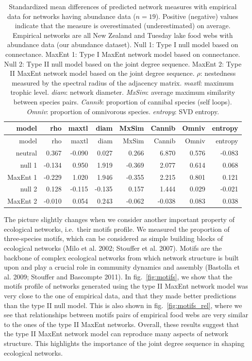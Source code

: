 \documentclass[10pt,oneside]{article}
\begin{document}
\hypertarget{tbl:measures_abund}{}
\begin{longtable}[]{@{}rrrrrrrr@{}}
\caption{\label{tbl:measures_abund}Standardized mean differences of
predicted network measures with empirical data for networks having
abundance data (\(n = 19\)). Positive (negative) values indicate that
the measure is overestimated (underestimated) on average. Empirical
networks are all New Zealand and Tuesday lake food webs with abundance
data (our abundance dataset). Null 1: Type I null model based on
connectance. MaxEnt 1: Type I MaxEnt network model based on connectance.
Null 2: Type II null model based on the joint degree sequence. MaxEnt 2:
Type II MaxEnt network model based on the joint degree sequence.
\(\rho\): nestedness measured by the spectral radius of the adjacency
matrix. \emph{maxtl}: maximum trophic level. \emph{diam}: network
diameter. \emph{MxSim}: average maximum similarity between species
pairs. \emph{Cannib}: proportion of cannibal species (self loops).
\emph{Omniv}: proportion of omnivorous species. \emph{entropy}: SVD
entropy.}\tabularnewline
\toprule
model & rho & maxtl & diam & MxSim & Cannib & Omniv &
entropy\tabularnewline
\midrule
\endfirsthead
\toprule
model & rho & maxtl & diam & MxSim & Cannib & Omniv &
entropy\tabularnewline
\midrule
\endhead
neutral & 0.367 & -0.090 & 0.027 & 0.266 & 6.870 & 0.576 &
-0.083\tabularnewline
null 1 & -0.134 & 0.950 & 1.919 & -0.369 & 2.077 & 0.614 &
0.068\tabularnewline
MaxEnt 1 & -0.229 & 1.020 & 1.946 & -0.355 & 2.215 & 0.801 &
0.121\tabularnewline
null 2 & 0.128 & -0.115 & -0.135 & 0.157 & 1.444 & 0.029 &
-0.021\tabularnewline
MaxEnt 2 & -0.010 & 0.054 & 0.243 & -0.062 & -0.038 & 0.083 &
0.038\tabularnewline
\bottomrule
\end{longtable}

The picture slightly changes when we consider another important property
of ecological networks, i.e.~their motifs profile. We measured the
proportion of three-species motifs, which can be considered as simple
building blocks of ecological networks (Milo et al. 2002; Stouffer et
al. 2007). Motifs are the backbone of complex ecological networks from
which network structure is built upon and play a crucial role in
community dynamics and assembly (Bastolla et al. 2009; Stouffer and
Bascompte 2011). In fig.~\ref{fig:motifs}, we show that the motifs
profile of networks generated using the type II MaxEnt network model was
very close to the one of empirical data, and that they made better
predictions than the type II null model. This is also shown in
fig.~\ref{fig:motifs_rel}, where we see that relationships between
motifs pairs of empirical food webs are very similar to the ones of the
type II MaxEnt networks. Overall, these results suggest that the type II
MaxEnt network model can reproduce many aspects of network structure.
This highlights the importance of the joint degree sequence in shaping
ecological networks.
\end{document}
